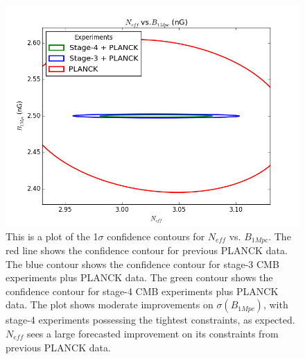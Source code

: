 \begin{figure}[h]
\centering
\includegraphics[scale=0.85]{images/contours/neff.png}
\caption{This is a plot of the 1$\sigma$ confidence contours for $N_{eff}$ vs. $B_{1Mpc}$. The red line shows the confidence contour for previous PLANCK data. The blue contour shows the confidence contour for stage-3 CMB experiments plus PLANCK data. The green contour shows the confidence contour for stage-4 CMB experiments plus PLANCK data. The plot shows moderate improvements on $\sigma(B_{1Mpc})$, with stage-4 experiments possessing the tightest constraints, as expected. $N_{eff}$ sees a large forecasted improvement on its constraints from previous PLANCK data. }
\label{fig:neff}
\end{figure}

